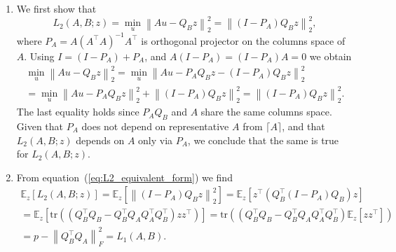 \documentclass{article}
\begin{document}
\begin{enumerate}
	Now, when we know that $L_{1}(A, B)$ does not depend on the chosen representatives, it is easy to show that the minimal value of loss is $0$ and it is reached when $\mathcal{S}(B)\subset \mathcal{S}(A)$. To see this, select representatives such that $Q_{A} = \begin{pmatrix}\widetilde{Q}_{B} & \widetilde{Q}_{B}^\perp\end{pmatrix}$, where $\widetilde{Q}_{B}$ is block matrix formed from subset of columns of $Q_{B}$ and columns of $\widetilde{Q}_{B}^\perp$ are all orthogonal to $Q_{B}$. This selection is always possible since $(I- Q_{B}Q_{B}^\top) + Q_{B}Q_{B}^\top = I$. Representatives selected in this form give
	\begin{equation}
		L_1(A, B) = p - \left\|Q_{B}^\top \widetilde{Q}_{B}\right\|_{F}^2 = p - q \geq 0,
	\end{equation}
	where $\widetilde{Q}_{B}\in\mathbb{R}^{n\times q}, q\leq p$. The last identity follows by construction: $\widetilde{Q}_{B}$ is composed from columns of $Q_{B}$. Loss becomes zero only if $p = q$, or, equivalently, $\mathcal{S}(B)\subset \mathcal{S}(A)$.
	\item We first show that
	\begin{equation}
		\label{eq:L2_equivalent_form}
		L_2(A, B; z) = \min_{u} \left\| Au - Q_{B}z\right\|_{2}^{2} = \left\|\left(I - P_{A}\right) Q_{B}z\right\|_{2}^{2},
	\end{equation}
	where $P_{A} = A\left(A^\top A\right)^{-1}A^\top$ is orthogonal projector on the columns space of $A$. Using $I = \left(I - P_{A}\right) + P_{A}$, and $A \left(I - P_{A}\right) =  \left(I - P_{A}\right) A = 0$ we obtain
	\begin{multline}
		\min_{u} \left\| Au - Q_{B}z\right\|_{2}^{2} = \min_{u} \left\| Au - P_{A}Q_{B}z - \left(I - P_{A}\right) Q_{B}z\right\|_{2}^{2} \\= \min_{u} \left\| Au - P_{A}Q_{B}z\right\|_{2}^2 + \left\|\left(I - P_{A}\right) Q_{B}z\right\|_{2}^{2} = \left\|\left(I - P_{A}\right) Q_{B}z\right\|_{2}^{2}.
	\end{multline}
	The last equality holds since $P_{A}Q_{B}$ and $A$ share the same columns space. Given that $P_{A}$ does not depend on representative $A$ from $\lceil A\rceil$, and that $L_{2}(A, B; z)$ depends on $A$ only via $P_{A}$, we conclude that the same is true for $L_{2}(A, B; z)$.
	\item From equation~(\ref{eq:L2_equivalent_form}) we find
	\begin{multline}
		\mathbb{E}_{z}\left[L_2(A, B; z)\right] = \mathbb{E}_{z}\left[\left\|\left(I - P_{A}\right) Q_{B}z\right\|_{2}^{2}\right]  = \mathbb{E}_{z}\left[ z^\top\left(Q_B^\top \left(I - P_{A}\right) Q_{B}\right)z\right] \\ = \mathbb{E}_{z}\left[ \text{tr} \left(\left(Q_{B}^\top Q_B - Q_{B}^\top Q_{A}Q_{A}^\top Q_{B}^\top\right)zz^\top\right) \right] = \text{tr} \left(\left(Q_{B}^\top Q_B - Q_{B}^\top Q_{A}Q_{A}^\top Q_{B}^\top\right)\mathbb{E}_{z}\left[zz^\top\right]\right) \\ = p - \left\|Q_{B}^\top Q_{A}\right\|_{F}^2 = L_{1}(A, B).
	\end{multline}
\end{enumerate}
\end{document}
